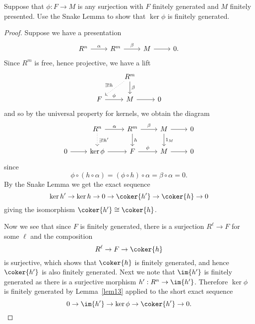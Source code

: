 \documentclass[10pt]{amsart}
\begin{document}
\begin{ex}
  Suppose that $\phi : F \rightarrow M$ is any surjection with $F$ finitely generated and $M$ finitely presented.
  Use the Snake Lemma to show that $\ker{\phi}$ is finitely generated.

  \begin{proof}
    Suppose we have a presentation
    $$\begin{tikzcd}
      R^n \arrow{r}{\alpha} & R^m \arrow{r}{\beta} & M \arrow{r} & 0.
    \end{tikzcd}$$
    Since $R^m$ is free, hence projective, we have a lift
    $$\begin{tikzcd}
      & R^m\arrow{d}{\beta} \arrow[dotted, swap]{ld}{\exists ! h} &\\
      F \arrow{r}{\phi} & M \arrow{r} & 0
    \end{tikzcd}$$
    and so by the universal property for kernels, we obtain the diagram
    $$\begin{tikzcd}
      & R^n \arrow[dotted]{d}{\exists ! h^\prime} \arrow{r}{\alpha} & R^m\arrow{r}{\beta} \arrow{d}{h} & M \arrow{d}{1_M}\arrow{r}& 0\\
      0 \arrow{r} & \ker\phi \arrow{r} & F \arrow{r}{\phi} & M \arrow{r}& 0
    \end{tikzcd}$$
    since
    $$\phi \circ (h \circ \alpha) = (\phi \circ h) \circ \alpha = \beta \circ \alpha = 0.$$
    By the Snake Lemma we get the exact sequence
    $$\ker{h^\prime} \rightarrow \ker h \rightarrow 0 \rightarrow \coker{h^\prime} \rightarrow \coker{h} \rightarrow 0$$
    giving the isomorphism $\coker{h^\prime} \cong \coker{h}$.

    Now we see that since $F$ is finitely generated, there is a surjection
    $R^\ell \rightarrow F$ for some $\ell$ and the composition
    $$R^\ell \rightarrow F \rightarrow \coker{h}$$
    is surjective, which shows that $\coker{h}$ is finitely generated, and hence $\coker{h^\prime}$ is also finitely generated.
    Next we note that $\im{h^\prime}$ is finitely generated as there is a surjective morphism $h^\prime : R^n \rightarrow \im{h^\prime}$.
    Therefore $\ker\phi$ is finitely generated by Lemma~\ref{lem13} applied to the short exact sequence
    $$0 \rightarrow \im{h^\prime} \rightarrow \ker\phi \rightarrow \coker{h^\prime} \rightarrow 0.$$
  \end{proof}
\end{ex}
\end{document}
